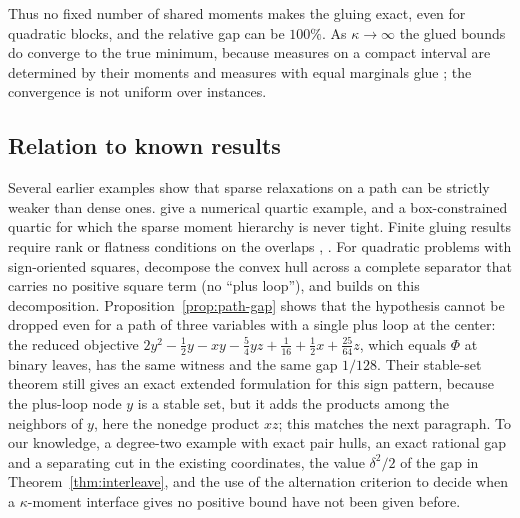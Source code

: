 Thus no fixed number of shared moments makes the gluing exact, even for
quadratic blocks, and the relative gap can be $100\%$. As $\kappa\to\infty$
the glued bounds do converge to the true minimum, because measures on a
compact interval are determined by their moments and measures with equal
marginals glue \citep[Lemma~6.3]{Lasserre2006}; the convergence is not
uniform over instances.

\subsection{Relation to known results}\label{sec:composition-literature}

Several earlier examples show that sparse relaxations on a path can be
strictly weaker than dense ones. \citet[Example~3.5]{NieDemmel2009} give a
numerical quartic example, and \citet[Example~6.7]{NieQuTangZhang2026} a
box-constrained quartic for which the sparse moment hierarchy is never
tight. Finite gluing results require rank or flatness conditions on the
overlaps \citep[Theorem~3.7]{Lasserre2006}, \citep{FantuzziFuentes2025}.
For quadratic problems with sign-oriented squares,
\citet[Corollary~1]{DeyKhajavirad2025} decompose the convex hull across a
complete separator that carries no positive square term (no ``plus loop''),
and \citet{Khajavirad2026} builds on this decomposition.
Proposition~\ref{prop:path-gap} shows that the hypothesis cannot be dropped
even for a path of three variables with a single plus loop at the center:
the reduced objective
$2y^2-\tfrac12y-xy-\tfrac54yz+\tfrac1{16}+\tfrac12x+\tfrac{25}{64}z$, which
equals $\Phi$ at binary leaves, has the same witness and the same gap $1/128$.
Their stable-set theorem \citep[Theorem~2]{DeyKhajavirad2025} still gives an
exact extended formulation for this sign pattern, because the plus-loop node
$y$ is a stable set, but it adds the products among the neighbors of $y$,
here the nonedge product $xz$; this matches the next paragraph. To our
knowledge, a degree-two example with exact pair hulls, an exact rational gap
and a separating cut in the existing coordinates, the value $\delta^2/2$ of
the gap in Theorem~\ref{thm:interleave}, and the use of the alternation
criterion to decide when a $\kappa$-moment interface gives no positive bound
have not been given before.

